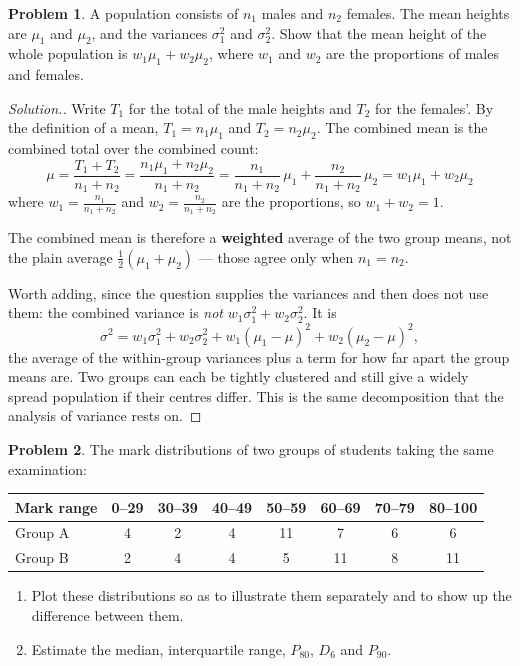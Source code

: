 \documentclass[11pt,a4paper]{article}
\theoremstyle{definition}
\newtheorem{problemx}{Problem}[section]
\newenvironment{problem}{\begin{problemx}}{\end{problemx}}
\newenvironment{solution}
  {\renewcommand{\qedsymbol}{}\begin{proof}[\textit{Solution}.]}
  {\end{proof}}
\begin{document}
\begin{problem}
A population consists of $n_1$ males and $n_2$ females. The mean heights are $\mu_1$ and
$\mu_2$, and the variances $\sigma^2_1$ and $\sigma^2_2$. Show that the mean height of the
whole population is $w_1\mu_1+w_2\mu_2$, where $w_1$ and $w_2$ are the proportions of males
and females.
\end{problem}

\begin{solution}
Write $T_1$ for the total of the male heights and $T_2$ for the females'. By the definition
of a mean, $T_1=n_1\mu_1$ and $T_2=n_2\mu_2$. The combined mean is the combined total over
the combined count:
\[\mu=\frac{T_1+T_2}{n_1+n_2}=\frac{n_1\mu_1+n_2\mu_2}{n_1+n_2}
=\frac{n_1}{n_1+n_2}\,\mu_1+\frac{n_2}{n_1+n_2}\,\mu_2=w_1\mu_1+w_2\mu_2\]
where $w_1=\frac{n_1}{n_1+n_2}$ and $w_2=\frac{n_2}{n_1+n_2}$ are the proportions, so
$w_1+w_2=1$.

The combined mean is therefore a \textbf{weighted} average of the two group means, not the
plain average $\frac{1}{2}(\mu_1+\mu_2)$ --- those agree only when $n_1=n_2$.

Worth adding, since the question supplies the variances and then does not use them: the
combined variance is \emph{not} $w_1\sigma_1^2+w_2\sigma_2^2$. It is
\[\sigma^2=w_1\sigma_1^2+w_2\sigma_2^2+w_1(\mu_1-\mu)^2+w_2(\mu_2-\mu)^2,\]
the average of the within-group variances plus a term for how far apart the group means
are. Two groups can each be tightly clustered and still give a widely spread population if
their centres differ. This is the same decomposition that the analysis of variance rests on.
\end{solution}

\begin{problem}
The mark distributions of two groups of students taking the same examination:
\begin{table}[H]
\centering
\begin{tabular}{|l|c|c|c|c|c|c|c|}
\hline
Mark range & 0--29 & 30--39 & 40--49 & 50--59 & 60--69 & 70--79 & 80--100\\
\hline
Group A & 4 & 2 & 4 & 11 & 7 & 6 & 6\\
Group B & 2 & 4 & 4 & 5 & 11 & 8 & 11\\
\hline
\end{tabular}
\end{table}
\begin{enumerate}
\item[(a).] Plot these distributions so as to illustrate them separately and to show up the
difference between them.
\item[(b).] Estimate the median, interquartile range, $P_{80}$, $D_6$ and $P_{90}$.
\end{enumerate}
\end{problem}
\end{document}
